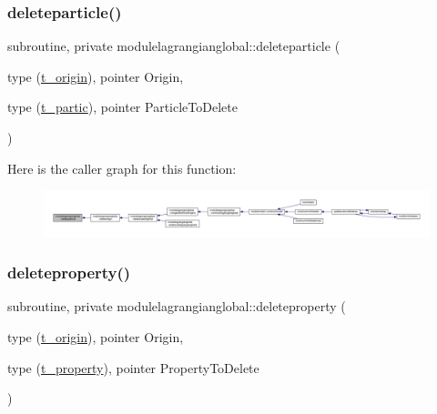 \subsubsection{\texorpdfstring{deleteparticle()}{deleteparticle()}}
{\footnotesize\ttfamily subroutine, private modulelagrangianglobal\+::deleteparticle (\begin{DoxyParamCaption}\item[{type (\mbox{\hyperlink{structmodulelagrangianglobal_1_1t__origin}{t\+\_\+origin}}), pointer}]{Origin,  }\item[{type (\mbox{\hyperlink{structmodulelagrangianglobal_1_1t__partic}{t\+\_\+partic}}), pointer}]{Particle\+To\+Delete }\end{DoxyParamCaption})\hspace{0.3cm}{\ttfamily [private]}}

Here is the caller graph for this function\+:\nopagebreak
\begin{figure}[H]
\begin{center}
\leavevmode
\includegraphics[width=350pt]{namespacemodulelagrangianglobal_aef9b588fe6eb57b2059f4fd96df7bd7d_icgraph}
\end{center}
\end{figure}
\mbox{\label{namespacemodulelagrangianglobal_af269f1bc18ee6db0ac6b2b6d27bc7499}} 
\subsubsection{\texorpdfstring{deleteproperty()}{deleteproperty()}}
{\footnotesize\ttfamily subroutine, private modulelagrangianglobal\+::deleteproperty (\begin{DoxyParamCaption}\item[{type (\mbox{\hyperlink{structmodulelagrangianglobal_1_1t__origin}{t\+\_\+origin}}), pointer}]{Origin,  }\item[{type (\mbox{\hyperlink{structmodulelagrangianglobal_1_1t__property}{t\+\_\+property}}), pointer}]{Property\+To\+Delete }\end{DoxyParamCaption})\hspace{0.3cm}{\ttfamily [private]}}


